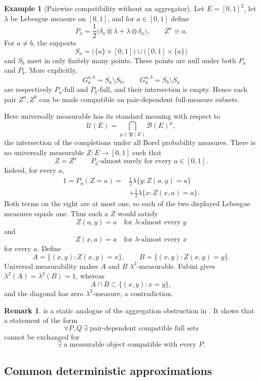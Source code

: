\documentclass[11pt,reqno]{amsart}
\theoremstyle{plain}
\theoremstyle{definition}
\newtheorem{remark}[remark]{Remark}
\newtheorem{example}[example]{Example}
\newcommand{\cB}{\mathcal B}
\begin{document}
\begin{example}[Pairwise compatibility without an aggregator]
\label{ex:no-aggregate}
Let \(E=[0,1]^2\), let \(\lambda\) be Lebesgue measure on \([0,1]\), and for
\(a\in[0,1]\) define
\[
  P_a=\frac12\bigl(\delta_a\otimes\lambda
                    +\lambda\otimes\delta_a\bigr),
  \qquad
  Z^a\equiv a .
\]
For \(a\ne b\), the supports
\[
  S_a=\bigl(\{a\}\times[0,1]\bigr)
      \cup\bigl([0,1]\times\{a\}\bigr)
\]
and \(S_b\) meet in only finitely many points.  These points are null under
both \(P_a\) and \(P_b\).  More explicitly,
\[
  G_a^{a,b}=S_a\setminus S_b,
  \qquad
  G_b^{a,b}=S_b\setminus S_a
\]
are respectively \(P_a\)-full and \(P_b\)-full, and their intersection is
empty.  Hence each pair \(Z^a,Z^b\) can be made compatible on pair-dependent
full-measure subsets.

Here universally measurable has its standard meaning with respect to
\[
  \mathcal U(E)
  =
  \bigcap_{\mu\in\mathfrak P(E)}\cB(E)^\mu,
\]
the intersection of the completions under all Borel probability measures.
There is no universally measurable
\(Z:E\to[0,1]\) such that
\[
  Z=Z^a\qquad P_a\text{-almost surely for every }a\in[0,1].
\]
Indeed, for every \(a\),
\begin{align*}
  1=P_a(Z=a)
  ={}&\frac12\lambda\{y:Z(a,y)=a\}\\
     &+\frac12\lambda\{x:Z(x,a)=a\}.
\end{align*}
Both terms on the right are at most one, so each of the two displayed
Lebesgue measures equals one.  Thus such a \(Z\) would satisfy
\[
  Z(a,y)=a\quad\text{for \(\lambda\)-almost every \(y\)}
\]
and
\[
  Z(x,a)=a\quad\text{for \(\lambda\)-almost every \(x\)}
\]
for every \(a\).  Define
\[
  A=\{(x,y):Z(x,y)=x\},
  \qquad
  B=\{(x,y):Z(x,y)=y\}.
\]
Universal measurability makes \(A\) and \(B\)
\(\lambda^2\)-measurable.  Fubini gives
\(\lambda^2(A)=\lambda^2(B)=1\), whereas
\[
  A\cap B\subset\{(x,y):x=y\},
\]
and the diagonal has zero \(\lambda^2\)-measure, a contradiction.
\end{example}

\begin{remark}
 is a static analogue of the aggregation obstruction in
\cite[Example 3.3]{STZ11}.  It shows that a statement of the
form
\[
  \forall P,Q\ \exists\text{ pair-dependent compatible full sets}
\]
cannot be exchanged for
\[
  \exists\text{ a measurable object compatible with every }P .
\]
\end{remark}

\subsection{Common deterministic approximations}
\end{document}
